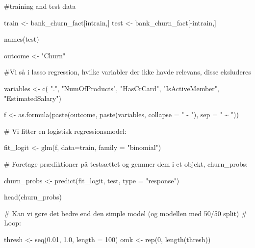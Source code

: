 \documentclass[
  letterpaper,
  DIV=11,
  numbers=noendperiod]{scrartcl}
\newenvironment{Shaded}{\begin{snugshade}}{\end{snugshade}}
\newcommand{\AttributeTok}[1]{\textcolor[rgb]{0.40,0.45,0.13}{#1}}
\newcommand{\CommentTok}[1]{\textcolor[rgb]{0.37,0.37,0.37}{#1}}
\newcommand{\DecValTok}[1]{\textcolor[rgb]{0.68,0.00,0.00}{#1}}
\newcommand{\FloatTok}[1]{\textcolor[rgb]{0.68,0.00,0.00}{#1}}
\newcommand{\FunctionTok}[1]{\textcolor[rgb]{0.28,0.35,0.67}{#1}}
\newcommand{\NormalTok}[1]{\textcolor[rgb]{0.00,0.23,0.31}{#1}}
\newcommand{\OtherTok}[1]{\textcolor[rgb]{0.00,0.23,0.31}{#1}}
\newcommand{\SpecialCharTok}[1]{\textcolor[rgb]{0.37,0.37,0.37}{#1}}
\newcommand{\StringTok}[1]{\textcolor[rgb]{0.13,0.47,0.30}{#1}}
\begin{document}
\begin{Shaded}
\begin{Highlighting}[]
\CommentTok{\#training and test data}

\NormalTok{train }\OtherTok{\textless{}{-}}\NormalTok{ bank\_churn\_fact[intrain,]}
\NormalTok{test }\OtherTok{\textless{}{-}}\NormalTok{ bank\_churn\_fact[}\SpecialCharTok{{-}}\NormalTok{intrain,]}

\FunctionTok{names}\NormalTok{(test)}

\NormalTok{outcome }\OtherTok{\textless{}{-}} \StringTok{"Churn"}

\CommentTok{\#Vi så i lasso regression, hvilke variabler der ikke havde relevans, disse eksluderes}

\NormalTok{variables }\OtherTok{\textless{}{-}} \FunctionTok{c}\NormalTok{( }\StringTok{"."}\NormalTok{, }\StringTok{"NumOfProducts"}\NormalTok{, }\StringTok{"HasCrCard"}\NormalTok{, }\StringTok{"IsActiveMember"}\NormalTok{, }
                         \StringTok{"EstimatedSalary"}\NormalTok{)}



\NormalTok{f }\OtherTok{\textless{}{-}} \FunctionTok{as.formula}\NormalTok{(}\FunctionTok{paste}\NormalTok{(outcome, }
                      \FunctionTok{paste}\NormalTok{(variables, }\AttributeTok{collapse =} \StringTok{" {-} "}\NormalTok{), }\AttributeTok{sep =} \StringTok{" \textasciitilde{} "}\NormalTok{))}



\CommentTok{\# Vi fitter en logistisk regressionsmodel:}

\NormalTok{fit\_logit }\OtherTok{\textless{}{-}} \FunctionTok{glm}\NormalTok{(f, }\AttributeTok{data=}\NormalTok{train, }\AttributeTok{family =} \StringTok{"binomial"}\NormalTok{)}


\CommentTok{\# Foretage prædiktioner på testsættet og gemmer dem i et objekt, churn\_probs:}

\NormalTok{churn\_probs }\OtherTok{\textless{}{-}} \FunctionTok{predict}\NormalTok{(fit\_logit, test, }\AttributeTok{type =} \StringTok{"response"}\NormalTok{)}

\FunctionTok{head}\NormalTok{(churn\_probs)}

\CommentTok{\# Kan vi gøre det bedre end den simple model (og modellen med 50/50 split)}
\CommentTok{\# Loop:}

\NormalTok{thresh }\OtherTok{\textless{}{-}} \FunctionTok{seq}\NormalTok{(}\FloatTok{0.01}\NormalTok{, }\FloatTok{1.0}\NormalTok{, }\AttributeTok{length =} \DecValTok{100}\NormalTok{)}
\NormalTok{omk }\OtherTok{\textless{}{-}} \FunctionTok{rep}\NormalTok{(}\DecValTok{0}\NormalTok{, }\FunctionTok{length}\NormalTok{(thresh))}


\end{Highlighting}
\end{Shaded}
\end{document}
